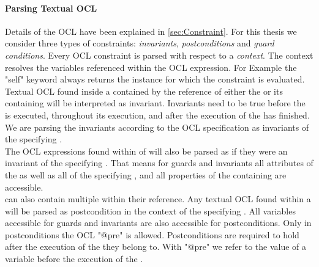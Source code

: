 \paragraph{Parsing Textual OCL}
\label{sec:OCLParsing}
Details of the OCL have been explained in \ref{sec:Constraint}. For this thesis we consider three types of constraints: \emph{invariants}, \emph{postconditions} and \emph{guard conditions}. Every OCL constraint is parsed with respect to a \emph{context}. The context resolves the variables referenced within the OCL expression. For Example the "self" keyword always returns the instance for which the constraint is evaluated.\\
Textual OCL found inside a  contained by the  reference of either the  or its containing  will be interpreted as invariant. Invariants need to be true before the  is executed, throughout its execution, and after the execution of the  has finished. We are parsing the invariants according to the OCL specification as invariants of the specifying . \\
The OCL expressions found within  of  will also be parsed as if they were an invariant of the specifying .
That means for guards and invariants all attributes of the  as well as all  of the specifying , and all properties of the containing  are accessible.\\
 can also contain multiple  within their  reference. Any textual OCL found within a  will be parsed as postcondition in the context of the specifying . All variables accessible for guards and invariants are also accessible for postconditions. Only in postconditions the OCL "@pre" is allowed. Postconditions are required to hold after the execution of the  they belong to. With "@pre" we refer to the value of a variable before the execution of the .

